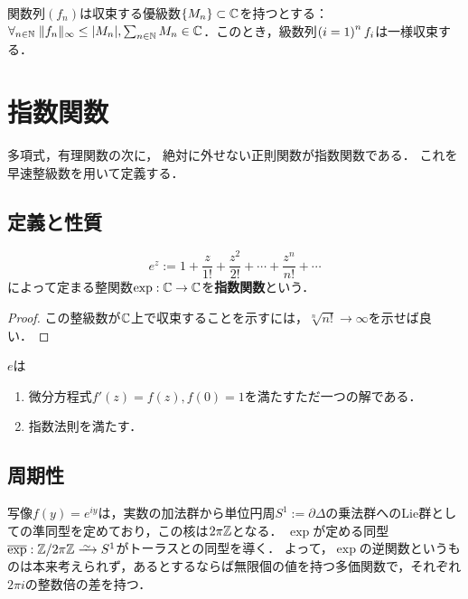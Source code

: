 \documentclass[uplatex, dvipdfmx]{jsreport}
\begin{document}
\begin{proposition}
    関数列$(f_n)$は収束する優級数$\{M_n\}\subset\mathbb{C}$を持つとする：$\forall_{n\in\mathbb{N}}\;\|f_n\|_\infty\le\lvert M_n\rvert,\sum_{n\in\mathbb{N}}M_n\in\mathbb{C}$．このとき，級数列$\left(i=1\right)^nf_i$は一様収束する．
\end{proposition}

\section{指数関数}

\begin{tcolorbox}[colframe=ForestGreen, colback=ForestGreen!10!white,breakable,colbacktitle=ForestGreen!40!white,coltitle=black,fonttitle=\bfseries\sffamily,
title=]
    多項式，有理関数の次に，
    絶対に外せない正則関数が指数関数である．
    これを早速整級数を用いて定義する．
\end{tcolorbox}

\subsection{定義と性質}

\begin{definition}
    \[e^z:=1+\frac{z}{1!}+\frac{z^2}{2!}+\cdots+\frac{z^n}{n!}+\cdots\]
    によって定まる整関数$\exp:\mathbb{C}\to\mathbb{C}$を\textbf{指数関数}という．
\end{definition}
\begin{proof}
    この整級数が$\mathbb{C}$上で収束することを示すには，$\sqrt[n]{n!}\to\infty$を示せば良い．
\end{proof}

\begin{lemma}
    $e$は
    \begin{enumerate}
        \item 微分方程式$f'(z)=f(z),f(0)=1$を満たすただ一つの解である．
        \item 指数法則を満たす．
    \end{enumerate}
\end{lemma}

\subsection{周期性}

\begin{tcolorbox}[colframe=ForestGreen, colback=ForestGreen!10!white,breakable,colbacktitle=ForestGreen!40!white,coltitle=black,fonttitle=\bfseries\sffamily,
title=]
    写像$f(y)=e^{iy}$は，実数の加法群から単位円周$S^1:=\partial\Delta$の乗法群へのLie群としての準同型を定めており，この核は$2\pi\mathbb{Z}$となる．
    $\exp$が定める同型$\o{\exp}:\Z/2\pi\Z\iso S^1$がトーラスとの同型を導く．
    よって，$\exp$の逆関数というものは本来考えられず，あるとするならば無限個の値を持つ多価関数で，それぞれ$2\pi i$の整数倍の差を持つ．
\end{tcolorbox}
\end{document}
